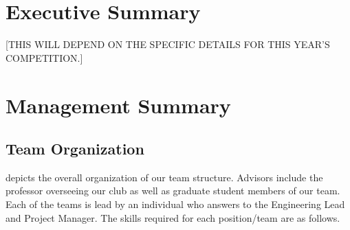 \documentclass[proposal]{byu-aero}
\begin{document}

\section{Executive Summary} %
\label{sec:ExecutiveSummary}

{\color{BYUred}[THIS WILL DEPEND ON THE SPECIFIC DETAILS FOR THIS YEAR'S COMPETITION.]}
\lipsum[1-2]





\section{Management Summary} %
\label{sec:ManagementSummary}



\subsection{Team Organization}
\label{ssec:TeamOrganization}



 depicts the overall organization of our team structure.  Advisors include the professor overseeing our club as well as graduate student members of our team.  Each of the teams is lead by an individual who answers to the Engineering Lead and Project Manager.  The skills required for each position/team are as follows.
\end{document}
